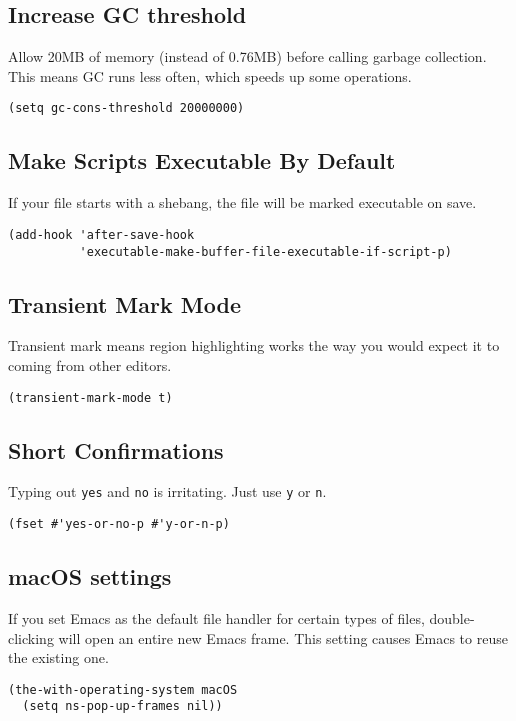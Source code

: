 \documentclass[11pt]{article}
\begin{document}
\subsection{Increase GC threshold}
\label{sec:org2db022e}
Allow 20MB of memory (instead of 0.76MB) before calling garbage
collection. This means GC runs less often, which speeds up some
operations.
\begin{verbatim}
(setq gc-cons-threshold 20000000)
\end{verbatim}

\subsection{Make Scripts Executable By Default}
\label{sec:orgef92526}
If your file starts with a shebang, the file will be marked executable
on save.
\begin{verbatim}
(add-hook 'after-save-hook
          'executable-make-buffer-file-executable-if-script-p)
\end{verbatim}

\subsection{Transient Mark Mode}
\label{sec:org1301117}
Transient mark means region highlighting works the way you would
expect it to coming from other editors.
\begin{verbatim}
(transient-mark-mode t)
\end{verbatim}

\subsection{Short Confirmations}
\label{sec:org0b4499e}
Typing out \texttt{yes} and \texttt{no} is irritating. Just use \texttt{y} or \texttt{n}.
\begin{verbatim}
(fset #'yes-or-no-p #'y-or-n-p)
\end{verbatim}

\subsection{macOS settings}
\label{sec:org729c06b}
If you set Emacs as the default file handler for certain types of
files, double-clicking will open an entire new Emacs frame. This
setting causes Emacs to reuse the existing one.
\begin{verbatim}
(the-with-operating-system macOS
  (setq ns-pop-up-frames nil))
\end{verbatim}
\end{document}
